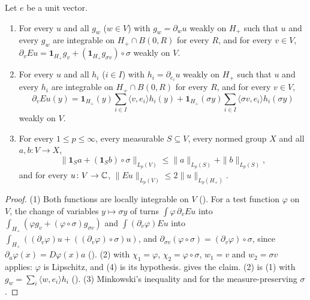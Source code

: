 \begin{theorem}
\label{thm:even-reflection}
\leanok
{}
Let $e$ be a unit vector.
\begin{enumerate}
  \item For every $u$ and all $g_w$ ($w \in V$) with $g_w = \partial_w u$ weakly on $H_+$ such
    that $u$ and every $g_w$ are integrable on $H_+ \cap B(0, R)$ for every $R$, and for every
    $v \in V$,
    $\partial_v E u = \mathbf 1_{H_+} g_v + (\mathbf 1_{H_+} g_{\sigma v}) \circ \sigma$ weakly on
    $V$.
  \item For every $u$ and all $h_i$ ($i \in I$) with $h_i = \partial_{e_i} u$ weakly on $H_+$ such
    that $u$ and every $h_i$ are integrable on $H_+ \cap B(0, R)$ for every $R$, and for every
    $v \in V$,
    \[
      \partial_v E u(y) = \mathbf 1_{H_+}(y) \sum_{i \in I} \langle v, e_i \rangle h_i(y)
        + \mathbf 1_{H_+}(\sigma y) \sum_{i \in I} \langle \sigma v, e_i \rangle h_i(\sigma y)
    \]
    weakly on $V$.
  \item For every $1 \leq p \leq \infty$, every measurable $S \subseteq V$, every normed group $X$
    and all $a, b \colon V \to X$,
    \[
      \bigl\| \mathbf 1_S a + (\mathbf 1_S b) \circ \sigma \bigr\|_{L_p(V)} \leq
      \|a\|_{L_p(S)} + \|b\|_{L_p(S)} ,
    \]
    and for every $u \colon V \to \mathbb{C}$, $\|E u\|_{L_p(V)} \leq 2 \|u\|_{L_p(H_+)}$.
\end{enumerate}
\end{theorem}

\begin{proof}
\leanok
(1) Both functions are locally integrable on $V$ (). For a test
function $\varphi$ on $V$, the change of variables $y \mapsto \sigma y$ of
 turns $\int \varphi \, \partial_v E u$ into
$\int_{H_+} (\varphi g_v + (\varphi \circ \sigma) g_{\sigma v})$ and
$\int (\partial_v \varphi) E u$ into
$\int_{H_+} ((\partial_v \varphi) u + ((\partial_v \varphi) \circ \sigma) u)$, and
$\partial_{\sigma v} (\varphi \circ \sigma) = (\partial_v \varphi) \circ \sigma$, since
$\partial_a \varphi(x) = D\varphi(x) a$ ().
 (2) with $\chi_1 = \varphi$,
$\chi_2 = \varphi \circ \sigma$,
$w_1 = v$ and $w_2 = \sigma v$ applies: $\varphi$ is Lipschitz, and
 (4) is its hypothesis.  gives
the claim. (2) is (1) with $g_w = \sum_i \langle w, e_i \rangle h_i$
(). (3) Minkowski's inequality and
 for the measure-preserving $\sigma$.
\end{proof}

